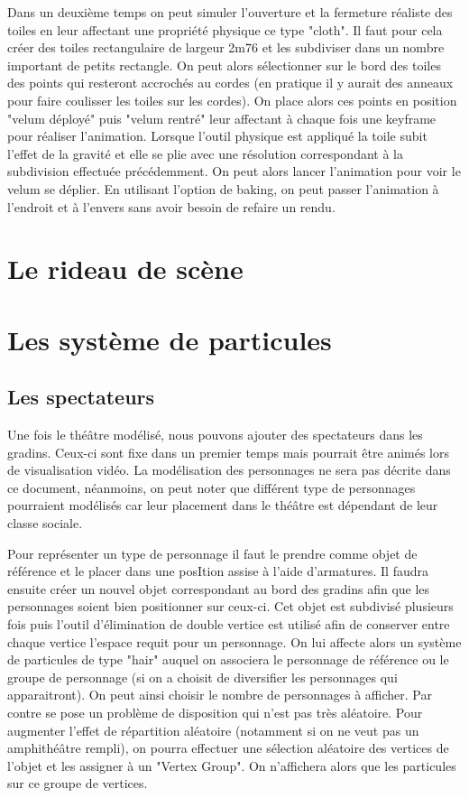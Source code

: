 Dans un deuxième temps on peut simuler l'ouverture et la fermeture réaliste des toiles en leur affectant une propriété physique ce type "cloth". Il faut pour cela créer des toiles rectangulaire de largeur 2m76 et les subdiviser dans un nombre important de petits rectangle. On peut alors sélectionner sur le bord des toiles des points qui resteront accrochés au cordes (en pratique il y aurait des anneaux pour faire coulisser les toiles sur les cordes). On place alors ces points en position "velum déployé" puis "velum rentré" leur affectant à chaque fois une \gls{keyframe} pour réaliser l'animation. Lorsque l'outil physique est appliqué la toile subit l'effet de la gravité et elle se plie avec une résolution correspondant à la subdivision effectuée précédemment. On peut alors lancer l'animation pour voir le velum se déplier. En utilisant l'option de \gls{baking}, on peut passer l'animation à l'endroit et à l'envers sans avoir besoin de refaire un rendu.

\section{Le rideau de scène}


\section{Les système de particules}
\subsection{Les spectateurs}
Une fois le théâtre modélisé, nous pouvons ajouter des spectateurs dans les gradins. Ceux-ci sont fixe dans un premier temps mais pourrait être animés lors de visualisation vidéo. La modélisation des personnages ne sera pas décrite dans ce document, néanmoins, on peut noter que différent type de personnages pourraient modélisés car leur placement dans le théâtre est dépendant de leur classe sociale.

Pour représenter un type de personnage il faut le prendre comme objet de référence et le placer dans une posItion assise à l'aide d'\glspl{armature}. Il faudra ensuite créer un nouvel objet correspondant au bord des gradins afin que les personnages soient bien positionner sur ceux-ci. Cet objet est subdivisé plusieurs fois puis l'outil d'élimination de double vertice est utilisé afin de conserver entre chaque vertice l'espace requit pour un personnage. On lui affecte alors un système de \glspl{particule} de type "hair" auquel on associera le personnage de référence ou le groupe de personnage (si on a choisit de diversifier les personnages qui apparaitront). On peut ainsi choisir le nombre de personnages à afficher. Par contre se pose un problème de disposition qui n'est pas très aléatoire. Pour augmenter l'effet de répartition aléatoire (notamment si on ne veut pas un amphithéâtre rempli), on pourra effectuer une sélection aléatoire des vertices de l'objet et les assigner à un "Vertex Group". On n'affichera alors que les particules sur ce groupe de vertices. 


